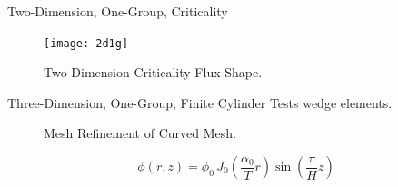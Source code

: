 \begin{frame}{Two-Dimension, One-Group, Criticality}
  \begin{figure}
    \centering
    \texttt{[image: 2d1g]}
    \caption{Two-Dimension Criticality Flux Shape.}
    \label{fig:2d1g}
  \end{figure}
\end{frame}

\begin{frame}{Three-Dimension, One-Group, Finite Cylinder}
  Tests wedge elements.
  \begin{table}
    \label{tab:finite_cyl}
    \begin{center}
    \end{center}
  \end{table}
  \begin{figure}
    \centering
    \vspace{0.2in}
    \caption{Mesh Refinement of Curved Mesh.}
    \label{fig:circle_meshes}
  \end{figure}
  \begin{equation}
    \label{eq:analytic_finite_cyl}
    \phi(r,z) = \phi_0 \, 
      J_0\left(\frac{\alpha_0}{T} r\right) \sin\left(\frac{\pi}{H} z \right)
  \end{equation}
\end{frame}

